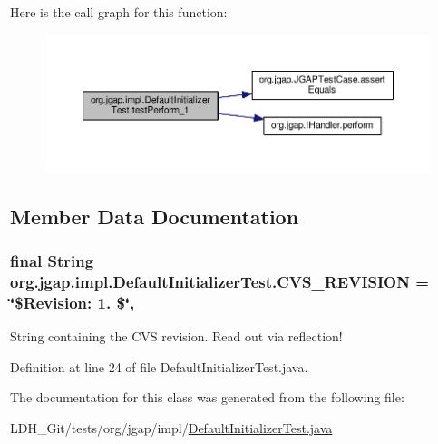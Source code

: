 Here is the call graph for this function\-:
\nopagebreak
\begin{figure}[H]
\begin{center}
\leavevmode
\includegraphics[width=350pt]{classorg_1_1jgap_1_1impl_1_1_default_initializer_test_af88735b99ae447a9d6fed7fcdf06bb3b_cgraph}
\end{center}
\end{figure}




\subsection{Member Data Documentation}
\hypertarget{classorg_1_1jgap_1_1impl_1_1_default_initializer_test_a3028af9f47136b53ca21d95d0c98de46}{
\subsubsection[{C\-V\-S\-\_\-\-R\-E\-V\-I\-S\-I\-O\-N}]{\setlength{\rightskip}{0pt plus 5cm}final String org.\-jgap.\-impl.\-Default\-Initializer\-Test.\-C\-V\-S\-\_\-\-R\-E\-V\-I\-S\-I\-O\-N = \char`\"{}\$Revision\-: 1. \$\char`\"{}\hspace{0.3cm}{\ttfamily [static]}, {\ttfamily [private]}}}\label{classorg_1_1jgap_1_1impl_1_1_default_initializer_test_a3028af9f47136b53ca21d95d0c98de46}
String containing the C\-V\-S revision. Read out via reflection! 

Definition at line 24 of file Default\-Initializer\-Test.\-java.



The documentation for this class was generated from the following file\-:\begin{DoxyCompactItemize}
\item 
L\-D\-H\-\_\-\-Git/tests/org/jgap/impl/\hyperlink{_default_initializer_test_8java}{Default\-Initializer\-Test.\-java}\end{DoxyCompactItemize}
